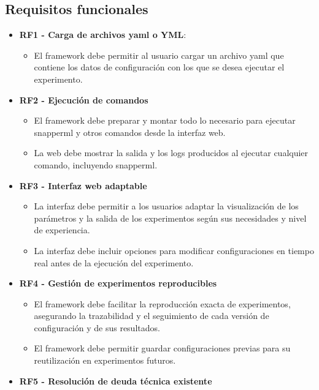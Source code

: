 \subsection{Requisitos funcionales}
\begin{itemize}
    \item \textbf{RF1 - Carga de archivos \acrshort{yaml} o YML}:
          \begin{itemize}
              \item El \gls{framework} debe permitir al usuario cargar un archivo \acrshort{yaml} que contiene los datos de configuración con los que se desea ejecutar el experimento.
          \end{itemize}
    \item \textbf{RF2 - Ejecución de comandos}
          \begin{itemize}
              \item El \gls{framework} debe preparar y montar todo lo necesario para ejecutar \Gls{snapperml} y otros comandos desde la interfaz web.
              \item La web debe mostrar la salida y los \glspl{log} producidos al ejecutar cualquier comando, incluyendo \Gls{snapperml}.
          \end{itemize}
    \item \textbf{RF3 - Interfaz web adaptable}
          \begin{itemize}
              \item La interfaz debe permitir a los usuarios adaptar la visualización de los parámetros y la salida de los experimentos según sus necesidades y nivel de experiencia.
              \item La interfaz debe incluir opciones para modificar configuraciones en tiempo real antes de la ejecución del experimento.
          \end{itemize}
    \item \textbf{RF4 - Gestión de experimentos reproducibles}
          \begin{itemize}
              \item El \gls{framework} debe facilitar la reproducción exacta de experimentos, asegurando la trazabilidad y el seguimiento de cada versión de configuración y de sus resultados.
              \item El \gls{framework} debe permitir guardar configuraciones previas para su reutilización en experimentos futuros.
          \end{itemize}
    \item \textbf{RF5 - Resolución de deuda técnica existente}

\end{itemize}
